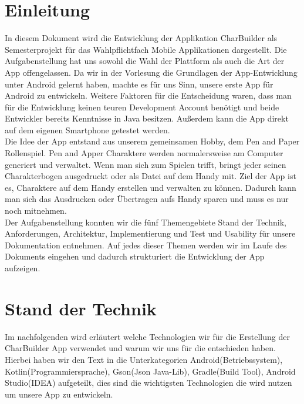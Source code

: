\newpage
\section{Einleitung}
In diesem Dokument wird die Entwicklung der Applikation CharBuilder als Semesterprojekt für das Wahlpflichtfach Mobile Applikationen dargestellt. Die Aufgabenstellung hat uns sowohl die Wahl der Plattform als auch die Art der App offengelassen. Da wir in der Vorlesung die Grundlagen der App-Entwicklung unter Android gelernt haben, machte es für uns Sinn, unsere erste App für Android zu entwickeln. Weitere Faktoren für die Entscheidung waren, dass man für die Entwicklung keinen teuren Development Account benötigt und beide Entwickler bereits Kenntnisse in Java besitzen. Außerdem kann die App direkt auf dem eigenen Smartphone getestet werden.\\

Die Idee der App entstand aus unserem gemeinsamen Hobby, dem Pen and Paper Rollenspiel. Pen and Apper Charaktere werden normalersweise am Computer generiert und verwaltet. Wenn man sich zum Spielen trifft, bringt jeder seinen Charakterbogen ausgedruckt oder als Datei auf dem Handy mit. Ziel der App ist es, Charaktere auf dem Handy erstellen und verwalten zu können. Dadurch kann man sich das Ausdrucken oder Übertragen aufs Handy sparen und muss es nur noch mitnehmen.\\

Der Aufgabenstellung konnten wir die fünf Themengebiete Stand der Technik, Anforderungen, Architektur, Implementierung und Test und Usability für unsere Dokumentation entnehmen. Auf jedes dieser Themen werden wir im Laufe des Dokuments eingehen und dadurch strukturiert die Entwicklung der App aufzeigen.

\newpage
\section{Stand der Technik}
Im nachfolgenden wird erläutert welche Technologien wir für die Erstellung der CharBuilder App verwendet
und warum wir uns für die entschieden haben. Hierbei haben wir den Text in die Unterkategorien Android(Betriebssystem), Kotlin(Programmiersprache), Gson(Json Java-Lib), Gradle(Build Tool), Android Studio(IDEA) aufgeteilt, dies sind die wichtigsten Technologien die wird nutzen um unsere App zu entwickeln.

